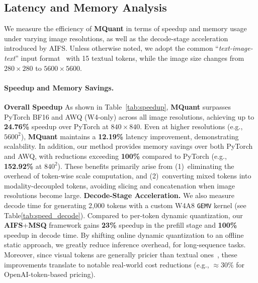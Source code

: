 \vspace{-2mm}
\subsection{Latency and Memory Analysis}
We measure the efficiency of \textbf{MQuant} in terms of speedup and memory usage under varying image resolutions, as well as the decode-stage acceleration introduced by AIFS. Unless otherwise noted, we adopt the common ``\textit{text-image-text}'' input format~\citep{duan2024vlmevalkit} with 15 textual tokens, while the image size changes from $280\times280$ to $5600\times5600$.

\vspace{-2mm}
\paragraph{Speedup and Memory Savings.}
\textbf{\raisebox{-0.5pt}{\ding[1.1]{182\relax}} Overall Speedup} As shown in Table~\ref{tab:speedup}, \textbf{MQuant} surpasses PyTorch BF16 and AWQ (W4-only) across all image resolutions, achieving up to \textbf{24.76\%} speedup over PyTorch at $840\times 840$. Even at higher resolutions (e.g., $5600^2$), \textbf{MQuant} maintains a \textbf{12.19\%} latency improvement, demonstrating scalability. In addition, our method provides memory savings over both PyTorch and AWQ, with reductions exceeding \textbf{100\%} compared to PyTorch (e.g., \textbf{152.92\%} at $840^2$). These benefits primarily arise from (1)~eliminating the overhead of token-wise scale computation, and (2)~converting mixed tokens into modality-decoupled tokens, avoiding slicing and concatenation when image resolutions become large. 
\textbf{\raisebox{-0.5pt}{\ding[1.1]{183\relax}} Decode-Stage Acceleration.} We also measure decode time for generating 2{,}000 tokens with a custom W4A8 \texttt{GEMV} kernel (see Table\ref{tab:speed_decode}). Compared to per-token dynamic quantization, our \textbf{AIFS}+\textbf{MSQ} framework gains \textbf{23\%} speedup in the prefill stage and \textbf{100\%} speedup in decode time. By shifting online dynamic quantization to an offline static approach, we greatly reduce inference overhead, for long-sequence tasks. Moreover, since visual tokens are generally pricier than textual ones~\citep{duan2024vlmevalkit}, these improvements translate to notable real-world cost reductions (e.g., $\approx30\%$ for OpenAI-token-based pricing).

